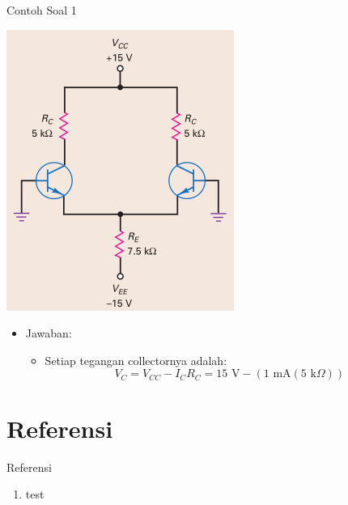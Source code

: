 \documentclass[aspectratio=169]{beamer}
\begin{document}
\begin{frame}{Contoh Soal 1}
	\begin{multicols}{2}
		\begin{center}
			\includegraphics[width=0.6\textheight]{gambar/01.latihan_soal_1a}
		\end{center}
		\columnbreak
		\begin{itemize}
			\item Jawaban:
			\begin{itemize}
				\item Setiap tegangan collectornya adalah:
				\[ V_C = V_{CC} - I_C R_C = 15 \text{ V} - (1 \text{ mA}(5 \text{ k}\Omega)) \]
			\end{itemize}
		\end{itemize}
		\vfill\null
	\end{multicols}
\end{frame}

\section{Referensi}
\begin{frame}{Referensi}
	\begin{enumerate}
		\item test
	\end{enumerate}
\end{frame}
\end{document}
